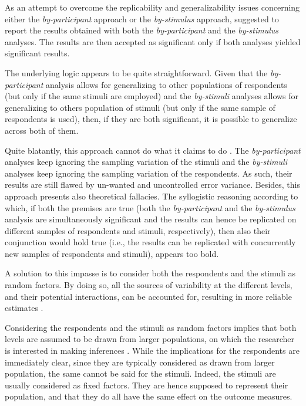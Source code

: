 \documentclass[12pt]{book}
\begin{document}
As an attempt to overcome the replicability and generalizability issues concerning either the \emph{by-participant} approach or the \emph{by-stimulus} approach,  suggested to report the results obtained with both the \emph{by-participant} and the \emph{by-stimulus} analyses. The results are then accepted as significant only if both analyses yielded significant results. 

The underlying logic appears to be quite straightforward. 
Given that the \emph{by-participant} analysis allows for generalizing to other populations of respondents (but only if the same stimuli are employed) and the \emph{by-stimuli} analyses allows for generalizing to others population of stimuli (but only if the same sample of respondents is used), then, if they are both significant, it is possible to generalize across both of them. 

Quite blatantly, this approach cannot do what it claims to do \cite{raaijmakers1999, raaijmakers2003}. 
The \emph{by-participant} analyses keep ignoring the sampling variation of the stimuli and the \emph{by-stimuli} analyses keep ignoring the sampling variation of the respondents. As such, their results are still flawed by un-wanted and uncontrolled error variance.
Besides, this approach presents also theoretical fallacies. 
The syllogistic reasoning according to which, if both the premises are true (both the \emph{by-participant} and the \emph{by-stimulus} analysis are simultaneously significant and the results can hence be replicated on different samples of respondents and stimuli, respectively), then also their conjunction would hold true (i.e., the results can be replicated with concurrently new samples of respondents and stimuli), appears too bold. 

A solution to this impasse is to consider both the respondents and the stimuli as random factors. 
By doing so, all the sources of variability at the different levels, and their potential interactions, can be accounted for, resulting in more reliable estimates \cite{Barr2013, judd2012, wols2017}.

Considering the respondents and the stimuli as random factors implies that both levels are assumed to be drawn from larger populations, on which the researcher is interested in making inferences \cite{judd2012, wols2017}. 
While the implications for the respondents are immediately clear, since they are typically considered as drawn from larger population, the same cannot be said for the stimuli. 
Indeed, the stimuli are usually considered as fixed factors. They are hence supposed to represent their population, and that they do all have the same effect on the outcome measures. 
\end{document}
